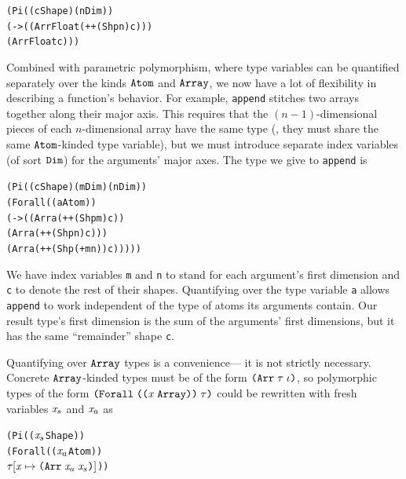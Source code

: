 \begin{alltt}
(Pi ((c Shape) (n Dim))
  (-> ((Arr Float (++ (Shp n) c)))
      (Arr Float c)))
\end{alltt}

Combined with parametric polymorphism,
where type variables can be quantified separately over
the kinds $\text{\tt Atom}$ and $\text{\tt Array}$,
we now have a lot of flexibility in describing a function's behavior.
For example, {\tt append} stitches two arrays together along their major axis.
This requires that
the $(n-1)$-dimensional pieces of each $n$-dimensional array
have the same type
(\ie, they must share the same $\text{\tt Atom}$-kinded type variable),
but we must introduce separate index variables
(of sort $\text{\tt Dim}$)
for the arguments' major axes.
The type we give to {\tt append} is

\begin{alltt}
(Pi ((c Shape) (m Dim) (n Dim))
  (Forall ((a Atom))
    (-> ((Arr a (++ (Shp m) c))
         (Arr a (++ (Shp n) c)))
        (Arr a (++ (Shp (+ m n)) c)))))
\end{alltt}
We have index variables {\tt m} and {\tt n} to stand for
each argument's first dimension
and {\tt c} to denote the rest of their shapes.
Quantifying over the type variable {\tt a} allows {\tt append} to work
independent of the type of atoms its arguments contain.
Our result type's first dimension is the sum of the arguments' first dimensions,
but it has the same ``remainder'' shape {\tt c}.

Quantifying over $\text{\tt Array}$ types is a convenience---%
it is not strictly necessary.
Concrete $\text{\tt Array}$-kinded types must be of the form
$\typearray{\type}{\idx}$,
so polymorphic types of the form
$\typeuniv{\notevar{\var}{\kindarray}}{\type}$
could be rewritten with fresh variables $\mathit{x}_s$ and $\mathit{x}_a$ as

\begin{alltt}
(Pi ((\(\var\sb{s}\) Shape))
  (Forall ((\(\var\sb{a}\) Atom))
    \(\subst{\type}{\var}{\typearray{\var\sb{a}}{\var\sb{s}}}\)))
\end{alltt}

